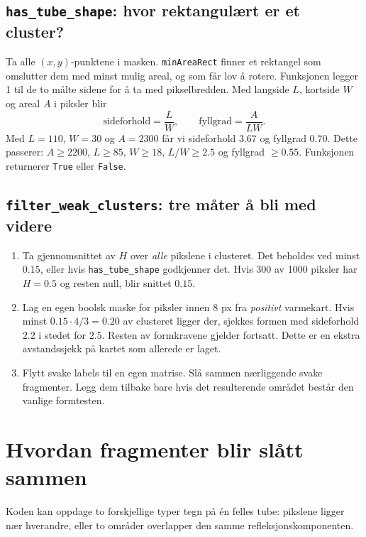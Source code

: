 \documentclass[11pt,a4paper]{article}
\newcommand{\code}[1]{\texttt{#1}}
\begin{document}
\subsection*{\texttt{has\_tube\_shape}: hvor rektangulært er et cluster?}
Ta alle $(x,y)$-punktene i masken. \code{minAreaRect} finner et rektangel som omslutter dem med minst mulig areal, og som får lov å rotere. Funksjonen legger 1 til de to målte sidene for å ta med pikselbredden. Med langside $L$, kortside $W$ og areal $A$ i piksler blir
\[
 \text{sideforhold}=\frac{L}{W},\qquad
 \text{fyllgrad}=\frac{A}{LW}.
\]
Med $L=110$, $W=30$ og $A=2300$ får vi sideforhold $3.67$ og fyllgrad $0.70$. Dette passerer: $A\geq2200$, $L\geq85$, $W\geq18$, $L/W\geq2.5$ og fyllgrad $\geq0.55$. Funksjonen returnerer \code{True} eller \code{False}.

\subsection*{\texttt{filter\_weak\_clusters}: tre måter å bli med videre}
\begin{enumerate}
\item Ta gjennomsnittet av $H$ over \emph{alle} pikslene i clusteret. Det beholdes ved minst $0.15$, eller hvis \code{has\_tube\_shape} godkjenner det. Hvis 300 av 1000 piksler har $H=0.5$ og resten null, blir snittet $0.15$.
\item Lag en egen boolsk maske for piksler innen 8 px fra \emph{positivt} varmekart. Hvis minst $0.15\cdot4/3=0.20$ av clusteret ligger der, sjekkes formen med sideforhold $2.2$ i stedet for $2.5$. Resten av formkravene gjelder fortsatt. Dette er en ekstra avstandssjekk på kartet som allerede er laget.
\item Flytt svake labels til en egen matrise. Slå sammen nærliggende svake fragmenter. Legg dem tilbake bare hvis det resulterende området består den vanlige formtesten.
\end{enumerate}

\newpage
\section{Hvordan fragmenter blir slått sammen}
Koden kan oppdage to forskjellige typer tegn på én felles tube: pikslene ligger nær hverandre, eller to områder overlapper den samme refleksjonskomponenten.
\end{document}
